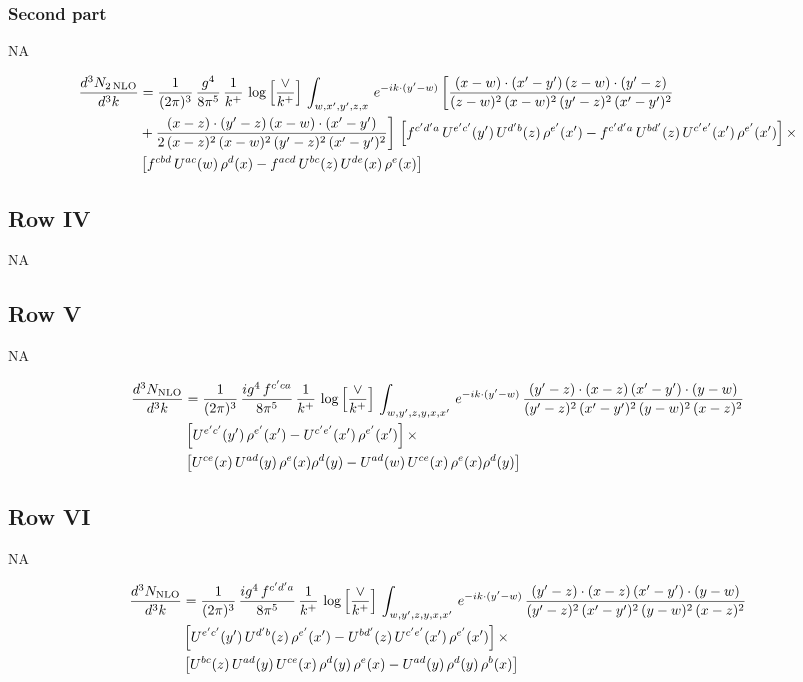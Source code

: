 \documentclass[9pt]{article}
\newcommand{\old}[1]{{\color{red}#1}}
\numberwithin{equation}{section}
\begin{document}
\subsubsection{Second part}
\old{\textsc{NA}}

{\color{blue}
\begin{align}
\frac{d^{3}N_{2\,\rm NLO}}{d^{3}k} & = \frac{1}{(2\pi)^{3}}\,\frac{g^{4}}{8\pi^{5}}\,\frac{1}{k^{+}}\,\log{\left[\frac{\vee}{k^{+}}\right]}\,\int_{w,x',y',z,x}\, e^{-ik\cdot (y'-w)}\,\bigg[\frac{(x-w)\cdot (x'-y')\,(z-w)\cdot (y'-z)}{(z-w)^{2}\,(x-w)^{2}\,(y'-z)^{2}\,(x'-y')^{2}}\notag \\
& +\frac{(x-z)\cdot (y'-z)\,(x-w)\cdot (x'-y')}{2\,(x-z)^{2}\,(x-w)^{2}\,(y'-z)^{2}\,(x'-y')^{2}}\bigg]\, \left[f^{c'd'a}\,U^{e'c'}(y')\,U^{d'b}(z)\,\rho^{e'}(x')-f^{c'd'a}\, U^{bd'}(z)\,U^{c'e'}(x')\,\rho^{e'}(x')\right]\times\notag \\
& \left[f^{cbd}\,U^{ac}(w)\,\rho^{d}(x) -f^{acd}\,U^{bc}(z)\,U^{de}(x)\,\rho^{e}(x)\right]
\end{align}}

\subsection{Row IV}
\textsc{NA}
\subsection{Row V}
\old{\textsc{NA}}

{\color{blue}
\begin{align}
\frac{d^{3}N_{\rm NLO}}{d^{3}k} & = \frac{1}{(2\pi)^{3}}\, \frac{ig^{4}\,f^{c'ca}}{8\pi^{5}}\, \frac{1}{k^{+}}\,\log{\left[\frac{\vee}{k^{+}}\right]}\,\int_{w,y',z,y,x,x'}\, e^{-ik\cdot (y'-w)}\,\frac{(y'-z)\cdot (x-z)\,(x'-y')\cdot (y-w)}{(y'-z)^{2}\,(x'-y')^{2}\,(y-w)^{2}\,(x-z)^{2}}\notag \\
& \left[U^{e'c'}(y')\,\rho^{e'}(x')-U^{c'e'}(x')\,\rho^{e'}(x')\right]\times\notag \\
& \left[U^{ce}(x)\,U^{ad}(y)\,\rho^{e}(x)\rho^{d}(y)-U^{ad}(w)\,U^{ce}(x)\,\rho^{e}(x)\rho^{d}(y)\right]
\end{align}}

\subsection{Row VI}
\old{\textsc{NA}}

{\color{blue}
\begin{align}
\frac{d^{3}N_{\rm NLO}}{d^{3}k} & = \frac{1}{(2\pi)^{3}}\, \frac{ig^{4}\,f^{c'd'a}}{8\pi^{5}}\, \frac{1}{k^{+}}\,\log{\left[\frac{\vee}{k^{+}}\right]}\,\int_{w,y',z,y,x,x'}\, e^{-ik\cdot (y'-w)}\,\frac{(y'-z)\cdot (x-z)\,(x'-y')\cdot (y-w)}{(y'-z)^{2}\,(x'-y')^{2}\,(y-w)^{2}\,(x-z)^{2}}\notag \\
& \left[U^{e'c'}(y')\,U^{d'b}(z)\,\rho^{e'}(x')-U^{bd'}(z)\,U^{c'e'}(x')\,\rho^{e'}(x')\right]\times\notag \\
& \left[U^{bc}(z)\,U^{ad}(y)\,U^{ce}(x)\,\rho^{d}(y)\,\rho^{e}(x)-U^{ad}(y)\,\rho^{d}(y)\,\rho^{b}(x)\right]
\end{align}}
\end{document}
